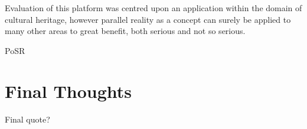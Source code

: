 Evaluation of this platform was centred upon an application within the domain of cultural heritage, however parallel reality as a concept can surely be applied to many other areas to great benefit, both serious and not so serious.

PoSR


\section{Final Thoughts}

Final quote?


